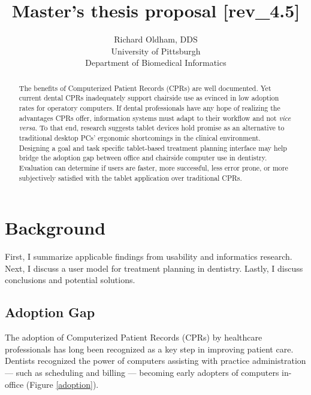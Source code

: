 \documentclass[11pt]{article}
\begin{document}
\title{Master's thesis proposal [rev\_4.5]} %
\author{\normalsize Richard Oldham, DDS \vspace{7pt} \\ 
		\small University of Pittsburgh \vspace{-2pt} \\
		\small Department of Biomedical Informatics}
\maketitle

\begin{abstract}
The benefits of Computerized Patient Records (CPRs) are well documented. Yet current dental CPRs inadequately support chairside use as evinced in low adoption rates for operatory computers. If dental professionals have any hope of realizing the advantages CPRs offer, information systems must adapt to their workflow and not \textit{vice versa}. To that end, research suggests tablet devices hold promise as an alternative to traditional desktop PCs' ergonomic shortcomings in the clinical environment. Designing a goal and task specific tablet-based treatment planning interface may help bridge the adoption gap between office and chairside computer use in dentistry. Evaluation can determine if users are faster, more successful, less error prone, or more subjectively satisfied with the tablet application over traditional CPRs.
\end{abstract}

\setcounter{tocdepth}{4}
\tableofcontents
\listoftables
\newpage

\section{Background}
First, I summarize applicable findings from usability and informatics research. Next, I discuss a user model for treatment planning in dentistry. Lastly, I discuss conclusions and potential solutions.

\subsection{Adoption Gap}

The adoption of Computerized Patient Records (CPRs) by healthcare professionals has long been recognized as a key step in improving patient care\cite{Chasteen1992A-computer-data,Eisne1993The-computer-ba,Thompson2004The-Decade-of-H,Spicer2008Bytes-and-bites,Schleyer2011Advancing-oral}. Dentists recognized the power of computers assisting with practice administration --- such as scheduling and billing --- becoming early adopters of computers in-office (Figure \ref{adoption}).
\end{document}
